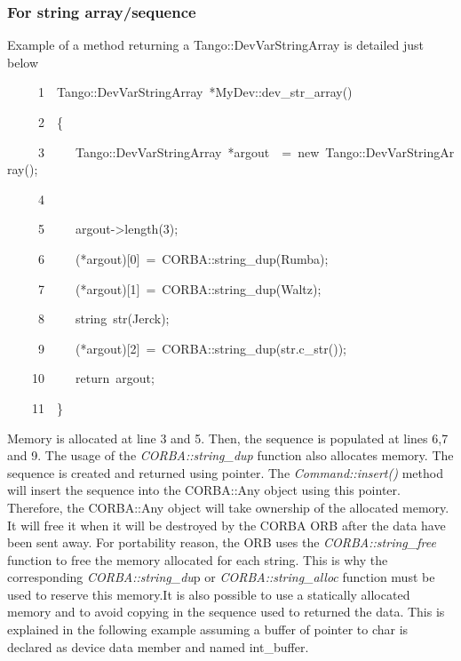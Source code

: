 \vspace{0.3cm}



\subsubsection{For string array/sequence}

Example of a method returning a Tango::DevVarStringArray
is detailed just below


\begin{lyxcode}
~~~~~1~~Tango::DevVarStringArray~{*}MyDev::dev\_str\_array()

~~~~~2~~\{

~~~~~3~~~~~Tango::DevVarStringArray~{*}argout~~=~new~Tango::DevVarStringArray();

~~~~~4~~

~~~~~5~~~~~argout->length(3);

~~~~~6~~~~~({*}argout){[}0{]}~=~CORBA::string\_dup(\textquotedbl{}Rumba\textquotedbl{});

~~~~~7~~~~~({*}argout){[}1{]}~=~CORBA::string\_dup(\textquotedbl{}Waltz\textquotedbl{});

~~~~~8~~~~~string~str(\textquotedbl{}Jerck\textquotedbl{});

~~~~~9~~~~~({*}argout){[}2{]}~=~CORBA::string\_dup(str.c\_str());

~~~~10~~~~~return~argout;

~~~~11~~\}
\end{lyxcode}


Memory is allocated at line 3 and 5. Then, the sequence
is populated at lines 6,7 and 9. The usage of the \emph{CORBA::string\_dup}
function also allocates memory. The sequence is created and returned
using pointer. The \emph{Command::insert()} method will insert the
sequence into the CORBA::Any object using this pointer. Therefore,
the CORBA::Any object will take ownership of the allocated memory.
It will free it when it will be destroyed by the CORBA ORB after the
data have been sent away. For portability reason, the ORB uses the
\emph{CORBA::string\_free} function to free the
memory allocated for each string. This is why the corresponding
\emph{CORBA::string\_du}p or \emph{CORBA::string\_alloc}
function must be used to reserve this memory.It is also possible to
use a statically allocated memory and to avoid copying in the sequence
used to returned the data. This is explained in the following example
assuming a buffer of pointer to char is declared as device data member
and named int\_buffer.

